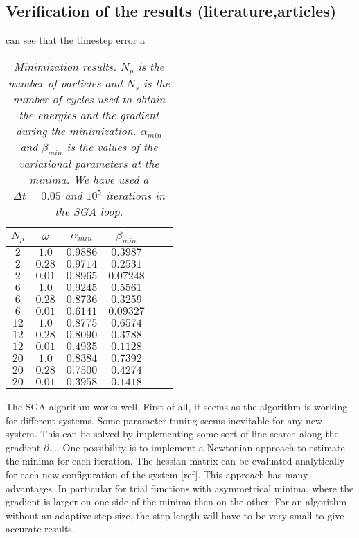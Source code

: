 \documentclass[a4paper,10pt,twocolumn]{article} %
\begin{document}
\subsection{Verification of the results (literature,articles)}



 can see that the timestep error   a 


\begin{table}[h!]
\begin{center}
\begin{tabular}{|c|c|c|c|c|c|}
\hline
$N_{p}$ & $\omega$ & $\alpha_{min}$ & $\beta_{min}$ \\ 
\hline
\hline
 $2$  & $1.0$ 	& $0.9886$ & $0.3987$ \\ 
 $2$  & $0.28$  & $0.9714$ & $0.2531$ \\ 
 $2$  & $0.01$  & $0.8965$ & $0.07248$ \\ 	 
\hline
 $6$  & $1.0$ 	& $0.9245$ & $0.5561$ \\ 
 $6$  & $0.28$  & $0.8736$ & $0.3259$ \\ 
 $6$  & $0.01$  & $0.6141$ & $0.09327$ \\ 
\hline
 $12$ & $1.0$ 	& $0.8775$ & $0.6574$ \\ 
 $12$ & $0.28$  & $0.8090$ & $0.3788$ \\ 
 $12$ & $0.01$  & $0.4935$ & $0.1128$ \\ 
\hline
 $20$ & $1.0 $ 	& $0.8384$ & $0.7392$ \\ 
 $20$ & $0.28$  & $0.7500$ & $0.4274$ \\ 
 $20$ & $0.01$  & $0.3958$ & $0.1418$ \\ 
\hline
\end{tabular}
\end{center}
\caption{{\it 
	Minimization results. $N_p$ is the number of particles and $N_s$ is the number of cycles used to obtain the energies and the gradient during the minimization.
	$\alpha_{min}$ and $\beta_{min}$ is the values of the variational parameters at the minima. 
	We have used a $\Delta t=0.05$ and $10^5$ iterations in the SGA loop. 
}}
\label{tab1}
\end{table}


The SGA algorithm works well. First of all, it seems as the algorithm is working for different systems. Some parameter tuning seems inevitable for any new system. This can be solved by implementing
some sort of line search along the gradient $\partial ...$. One possibility is to implement a Newtonian approach to estimate the minima for each iteration. The hessian matrix can be evaluated 
analytically for each new configuration of the system [ref]. This approach has many advantages. In particular for trial functions with asymmetrical minima, 
where the gradient is larger on one side of the minima then on the other. For an algorithm without an adaptive step size, the step length will have to be very small to give accurate results.
\end{document}

